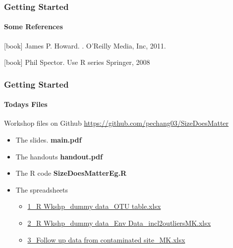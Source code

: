 \documentclass[12pt]{beamer}\usepackage[]{graphicx}\usepackage[]{color}
\begin{document}
\begin{frame}%
\frametitle{Getting Started}
  \framesubtitle{Some References}
  \begin{thebibliography}{10}    
  [book]
    James P. Howard.
    .
    \newblock O'Reilly Media, Inc, 2011.
 
  [book]
    Phil Spector.
    \newblock Use R series 
    \newblock Springer, 2008
    
  \end{thebibliography}
\end{frame}

\begin{frame}
  \frametitle{Getting Started}
  \framesubtitle{Todays Files}
\begin{block}{Workshop files on Github}
\url{https://github.com/pechang03/SizeDoesMatter}
\end{block}

\begin{itemize}
\item The slides. {\bf main.pdf}
\item The handouts {\bf handout.pdf}
\item The R code {\bf SizeDoesMatterEg.R}
\item The spreadsheets
\begin{itemize}
\item \url{1_R Wkshp_dummy data_OTU table.xlsx}
\item \url{2_R Wkshp_dummy data_Env Data_incl2outliersMK.xlsx}
\item \url{3_Follow up data from contaminated site_MK.xlsx}
\end{itemize}
\end{itemize}
\end{frame}
\end{document}
